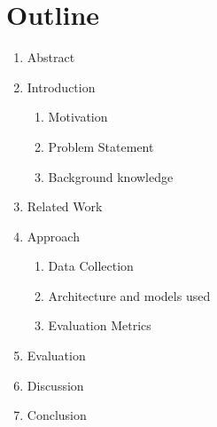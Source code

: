 
\section{Outline}

{

  \begin{enumerate}
    \item Abstract
    \item Introduction
    \begin{enumerate}
      \item Motivation
      \item Problem Statement
      \item Background knowledge
    \end{enumerate}
    \item Related Work
    \item Approach
    \begin{enumerate}
      \item Data Collection
      \item Architecture and models used
      \item Evaluation Metrics
    \end{enumerate}
    \item Evaluation
    \item Discussion
    \item Conclusion
  \end{enumerate}
}
